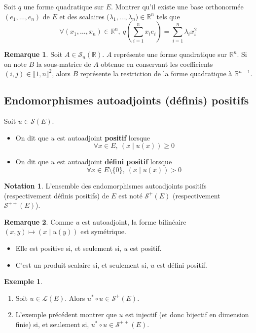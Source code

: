 \documentclass[french]{article}
\newcommand{\R}{\mathbb{R}}
\newcommand{\st}{^*}
\theoremstyle{plain}
\theoremstyle{definition}
\newtheorem*{ex}{Exemple}
\newtheorem*{rmq}{Remarque}
\newtheorem*{notation}{Notation}
\theoremstyle{remark}
\begin{document}
\begin{exo}
	Soit $q$ une forme quadratique sur $E$. Montrer qu'il existe une base orthonormée $(e_1,\ldots,e_n)$ de $E$ et des scalaires ($\lambda_1,\ldots,\lambda_n)\in\R^n$ tels que $$\forall (x_1,\ldots,x_n)\in\R^n,\ q\left(\sum_{i=1}^{n}x_ie_i\right)=\sum_{i=1}^{n}\lambda_ix_i^2$$
\end{exo}

\begin{rmq}
	Soit $A\in\mathcal{S}_n(\R)$. $A$ représente une forme quadratique sur $\R^n$. Si on note $B$ la sous-matrice de $A$ obtenue en conservant les coefficients $(i,j)\in\llbracket1,n\rrbracket^2$, alors $B$ représente la restriction de la forme quadratique à $\R^{n-1}$.
\end{rmq}

\subsection{Endomorphismes autoadjoints (définis) positifs}

\begin{dfn}
	Soit $u\in\mathcal{S}(E)$.
	\begin{itemize}
		\item On dit que $u$ est autoadjoint \textbf{positif} lorsque $$\forall x\in E,\ (x\mid u(x))\geqslant 0$$
		\item On dit que $u$ est autoadjoint \textbf{défini positif} lorsque $$\forall x\in E\setminus\{0\},\ (x\mid u(x))> 0$$
	\end{itemize}
\end{dfn}

\begin{notation}
	L'ensemble des endomorphismes autoadjoints positifs (respectivement définis positifs) de $E$ est noté $\mathcal{S}^+(E)$ (respectivement $\mathcal{S}^{++}(E)$).
\end{notation}

\begin{rmq}
	Comme $u$ est autoadjoint, la forme bilinéaire $(x,y)\mapsto (x\mid u(y))$ est symétrique.
	\begin{itemize}
		\item Elle est positive si, et seulement si, $u$ est positif.
		\item C'est un produit scalaire si, et seulement si, $u$ est défini positif.
	\end{itemize}
\end{rmq}

\begin{ex}
	\begin{enumerate}
		\item Soit $u\in\mathcal{L}(E)$. Alors $u\st\circ u\in\mathcal{S}^+(E)$.
		\item L'exemple précédent montrer que $u$ est injectif (et donc bijectif en dimension finie) si, et seulement si, $u\st\circ u\in\mathcal{S}^{++}(E)$.
	\end{enumerate}
\end{ex}
\end{document}
